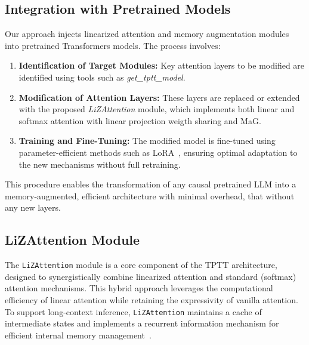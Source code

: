 \documentclass[10pt,a4paper]{article}
\begin{document}


\subsection{Integration with Pretrained Models}

Our approach injects linearized attention and memory augmentation modules into pretrained Transformers models. The process involves:
\begin{enumerate}
    \item \textbf{Identification of Target Modules:} Key attention layers to be modified are identified using tools such as \textit{get\_tptt\_model}.
    \item \textbf{Modification of Attention Layers:} These layers are replaced or extended with the proposed \textit{LiZAttention} module, which implements both linear and softmax attention with linear projection weigth sharing and MaG.
    \item \textbf{Training and Fine-Tuning:} The modified model is fine-tuned using parameter-efficient methods such as LoRA~\cite{hu2022lora}, ensuring optimal adaptation to the new mechanisms without full retraining.
\end{enumerate}
This procedure enables the transformation of any causal pretrained LLM into a memory-augmented, efficient architecture with minimal overhead, that without any new layers.


\subsection{LiZAttention Module}

The \texttt{LiZAttention} module is a core component of the TPTT architecture, designed to synergistically combine linearized attention and standard (softmax) attention mechanisms. This hybrid approach leverages the computational efficiency of linear attention while retaining the expressivity of vanilla attention. To support long-context inference, \texttt{LiZAttention} maintains a cache of intermediate states and implements a recurrent information mechanism for efficient internal memory management~\cite{katharopoulos2020transformers}.
\end{document}
